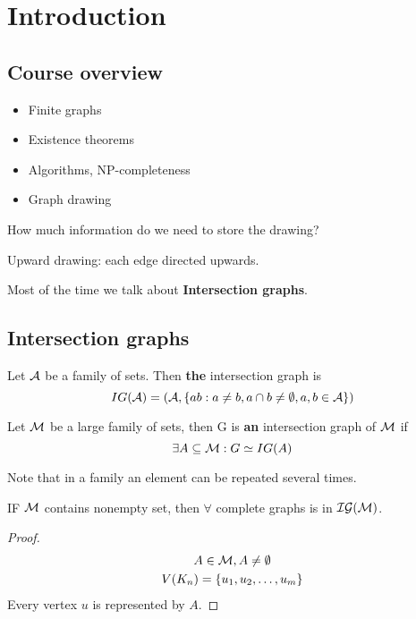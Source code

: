 \section{\texorpdfstring{Introduction}{Introduction}}
\vspace{5mm}
\large

\subsection{Course overview}

\begin{itemize}
	\item Finite graphs
	\item Existence theorems
	\item Algorithms, NP-completeness
	\item Graph drawing
\end{itemize}

How much information do we need to store the drawing?

Upward drawing: each edge directed upwards.

Most of the time we talk about \textbf{Intersection graphs}.

\subsection{Intersection graphs}

\begin{definition}
	Let $\operatorname{\mathcal{A}}$ be a family of sets.
	Then \textbf{the} intersection graph is
	\[ IG(\operatorname{\mathcal{A}}) = (\operatorname{\mathcal{A}}, \{ ab: a\ne b, a \cap b \ne \emptyset, a, b \in \operatorname{\mathcal{A}} \}) \]

	Let $\operatorname{\mathcal{M}}$ be a large family of sets, then G is \textbf{an} intersection graph of $\operatorname{\mathcal{M}}$ if
	\[ \exists A \subseteq \operatorname{\mathcal{M}}: G \simeq IG(A) \]

	Note that in a family an element can be repeated several times.
\end{definition}

\begin{observation}
	IF $\operatorname{\mathcal{M}}$ contains nonempty set, then $\forall$ complete graphs is in $\operatorname{\mathcal{IG}}(\operatorname{\mathcal{M}})$.
\end{observation}
\begin{proof}
	\begin{gather*}
		A \in \operatorname{\mathcal{M}}, A \ne \emptyset \\
		V(K_n) = \{ u_1, u_2, \ldots, u_m \} \\
	\end{gather*}
	Every vertex $u$ is represented by $A$.
\end{proof}


